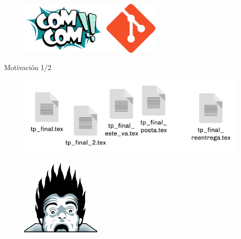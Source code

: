 \begin{frame}
  \titlepage
  \begin{figure}[ht]
      \begin{center}
          \includegraphics[height=1in]{images/logo-taller.png}
      \end{center}
  \end{figure}
\end{frame}

\begin{frame}{Motivación 1/2}

    \begin{figure}[ht]
        \begin{center}
            \includegraphics[height=1.5in]{images/caos.png}
        \end{center}
    \end{figure}

    \pause
    \begin{figure}[ht]
        \begin{center}
            \includegraphics[height=1.5in]{images/horror.png}
        \end{center}
    \end{figure}

\end{frame}

